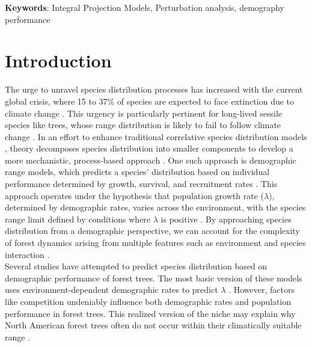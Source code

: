 \textbf{Keywords}: Integral Projection Models, Perturbation
analysis, demography performance

\hypertarget{introduction}{%
\section{Introduction}\label{introduction}}

The urge to unravel species distribution processes has increased with
the current global crisis, where 15 to 37\% of species are expected to
face extinction due to climate change \citep{thomas2004}. This urgency
is particularly pertinent for long-lived sessile species like trees,
whose range distribution is likely to fail to follow climate change
\citep{Zhu2012, Sittaro2017}. In an effort to enhance traditional
correlative species distribution models \citep[e.g.~][]{Guisan2000},
theory decomposes species distribution into smaller components to
develop a more mechanistic, process-based approach \citep{Evans2016}.
One such approach is demographic range models, which predicts a species'
distribution based on individual performance determined by growth,
survival, and recruitment rates \citep{Pagel2012}. This approach
operates under the hypothesis that population growth rate (\(\lambda\)),
determined by demographic rates, varies across the environment, with the
species range limit defined by conditions where \(\lambda\) is positive
\citep{maguire1973niche, Holt2009}. By approaching species distribution
from a demographic perspective, we can account for the complexity of
forest dynamics arising from multiple features such as environment and
species interaction \citep[Schurr2012;][]{Svenning2014}.\\

Several studies have attempted to predict species distribution based on
demographic performance of forest trees. The most basic version of these
models uses environment-dependent demographic rates to predict
\(\lambda\) \citep[e.g.~][]{Merow2014, Csergo2017}. However, factors
like competition undeniably influence both demographic rates
\citep{Luo2011, Clark2011, Zhang2015} and population performance
\citep{Scherrer2020, LeSquin2021} in forest trees. This realized version
of the niche \citep{Hutchinson1957} may explain why North American
forest trees often do not occur within their climatically suitable range
\citep{BoucherLalonde2012, Talluto2017}.\\

